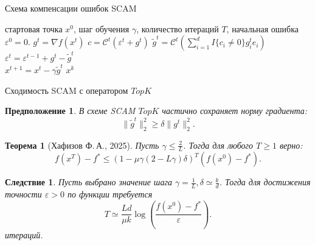 \documentclass{beamer}
\newtheorem{mytheorem}{Теорема}
\newtheorem{mycorollary}{Следствие}
\newtheorem{myassumption}{Предположение}
\begin{document}
\begin{frame}{Схема компенсации ошибок SCAM}
    \begin{algorithm}[H]
        \caption{SCAM (Одно устройство)}
        \label{alg:scam_single}
        \begin{algorithmic}
             стартовая точка $x^0$, шаг обучения $\gamma$, количество итераций $T$, начальная ошибка $\varepsilon^0 = 0$.
                \STATE $g^t = \nabla f(x^t)$
                \STATE $c = \mathcal{C}^t (\varepsilon^t + g^t)$
                \STATE $\tilde{g}^t = \mathcal{C}^t \left(\sum\limits_{i=1}^{d} I\{c_i \neq 0\} g^t_i e_i\right)$
                \STATE $\varepsilon^t = \varepsilon^{t-1} + g^t - \tilde{g}^t$\\
                \STATE $x^{t+1} = x^t - \gamma \tilde{g}^t$
            \ENDFOR
             $x^k$
        \end{algorithmic}
    \end{algorithm}
    
\end{frame}



\begin{frame}{Сходимость SCAM с оператором $TopK$}
    \begin{myassumption}\label{prop:scam_single_partial_norm}
        В схеме SCAM $TopK$ частично сохраняет норму градиента:
        \begin{equation}
            \|\tilde{g}^t\|_2^2 \geq \delta \|g^t\|_2^2.
        \end{equation}
    \end{myassumption}
    \begin{mytheorem}[Хафизов Ф.\,А., 2025]
        Пусть $\gamma \leq \frac{2}{L}$. Тогда для любого $T \geq 1$ верно:
        \begin{equation}
            f(x^T) - f^* \leq (1 - \mu \gamma (2 - L \gamma) \delta)^T (f(x^0) - f^*).
        \end{equation}
    \end{mytheorem}
    \begin{mycorollary}
        Пусть выбрано значение шага $\gamma = \frac{1}{L}, \delta \simeq \frac{k}{d}$. Тогда для достижения точности $\varepsilon > 0$ по функции требуется
        \begin{equation}
            T \simeq \frac{L d}{\mu k} \log\left(\frac{f(x^0) - f^*}{\varepsilon}\right).
        \end{equation}
        итераций.
    \end{mycorollary}
\end{frame}
\end{document}
